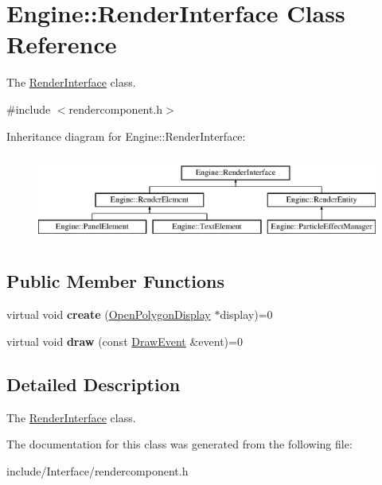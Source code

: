 \hypertarget{classEngine_1_1RenderInterface}{}\section{Engine\+:\+:Render\+Interface Class Reference}
\label{classEngine_1_1RenderInterface}


The \hyperlink{classEngine_1_1RenderInterface}{Render\+Interface} class.  




{\ttfamily \#include $<$rendercomponent.\+h$>$}

Inheritance diagram for Engine\+:\+:Render\+Interface\+:\begin{figure}[H]
\begin{center}
\leavevmode
\includegraphics[height=2.916667cm]{classEngine_1_1RenderInterface}
\end{center}
\end{figure}
\subsection*{Public Member Functions}
\begin{DoxyCompactItemize}
\item 
\hypertarget{classEngine_1_1RenderInterface_ac5dac1a7783516383d82e5b0bccd60ff}{}virtual void {\bfseries create} (\hyperlink{classEngine_1_1OpenPolygonDisplay}{Open\+Polygon\+Display} $\ast$display)=0\label{classEngine_1_1RenderInterface_ac5dac1a7783516383d82e5b0bccd60ff}

\item 
\hypertarget{classEngine_1_1RenderInterface_abeb512e124483478198d354fafb38378}{}virtual void {\bfseries draw} (const \hyperlink{classEngine_1_1DrawEvent}{Draw\+Event} \&event)=0\label{classEngine_1_1RenderInterface_abeb512e124483478198d354fafb38378}

\end{DoxyCompactItemize}


\subsection{Detailed Description}
The \hyperlink{classEngine_1_1RenderInterface}{Render\+Interface} class. 

The documentation for this class was generated from the following file\+:\begin{DoxyCompactItemize}
\item 
include/\+Interface/rendercomponent.\+h\end{DoxyCompactItemize}
